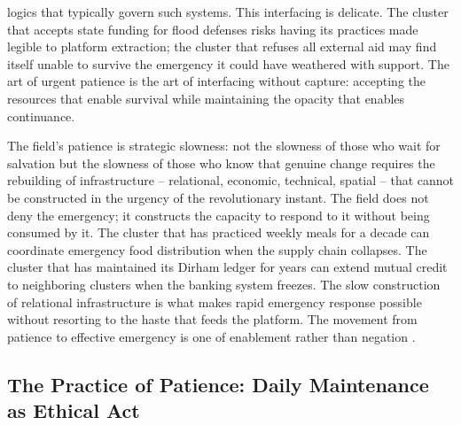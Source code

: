 logics that typically govern such systems. This interfacing is delicate. The cluster that accepts state funding for flood defenses risks having its practices made legible to platform extraction; the cluster that refuses all external aid may find itself unable to survive the emergency it could have weathered with support. The art of urgent patience is the art of interfacing without capture: accepting the resources that enable survival while maintaining the opacity that enables continuance.

The field’s patience is strategic slowness: not the slowness of those who wait for salvation but the slowness of those who know that genuine change requires the rebuilding of infrastructure – relational, economic, technical, spatial – that cannot be constructed in the urgency of the revolutionary instant. The field does not deny the emergency; it constructs the capacity to respond to it without being consumed by it. The cluster that has practiced weekly meals for a decade can coordinate emergency food distribution when the supply chain collapses. The cluster that has maintained its Dirham ledger for years can extend mutual credit to neighboring clusters when the banking system freezes. The slow construction of relational infrastructure is what makes rapid emergency response possible without resorting to the haste that feeds the platform. The movement from patience to effective emergency is one of enablement rather than negation \cite[pp.~21-32]{stengers_2015}.

\subsection{The Practice of Patience: Daily Maintenance as Ethical Act}


